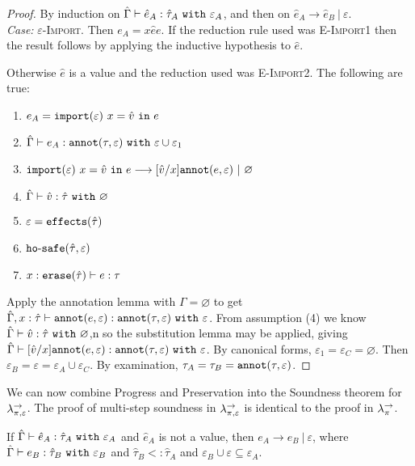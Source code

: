 \begin{proof} By induction on $\hat \Gamma \vdash \hat e_A: \hat \tau_A~\mathtt{with}~ \varepsilon_A$, and then on $\hat e_A \longrightarrow \hat e_B~|~\varepsilon$. \\

\textit{Case:} \textsc{$\varepsilon$-Import}. Then $e_A = {x}{\hat e}{e}$. If the reduction rule used was \textsc{E-Import1} then the result follows by applying the inductive hypothesis to $\hat e$.

Otherwise $\hat e$ is a value and the reduction used was \textsc{E-Import2}. The following are true:
\begin{enumerate}
	\setlength\itemsep{-0.7em}
	\item $e_A = \mathtt{import}(\varepsilon)~x = \hat v~\mathtt{in}~ e$
	\item $\hat \Gamma \vdash e_A: \mathtt{annot}(\tau, \varepsilon)~\mathtt{with}~ \varepsilon \cup \varepsilon_1$
	\item $\mathtt{import}(\varepsilon)~x = \hat v~\mathtt{in}~ e \longrightarrow [\hat v/x]\mathtt{annot}(e, \varepsilon)~|~\varnothing$
	\item $\hat \Gamma \vdash \hat v: \hat \tau~\mathtt{with}~ \varnothing$
	\item $\varepsilon = \mathtt{effects}(\hat \tau)$
	\item $\mathtt{ho \hbox{-} safe}(\hat \tau, \varepsilon)$
	\item $x: \mathtt{erase}(\hat \tau) \vdash e: \tau$
\end{enumerate}

\noindent
Apply the annotation lemma with $\Gamma = \varnothing$ to get $\hat \Gamma, x: \hat \tau \vdash \mathtt{annot}(e, \varepsilon): \mathtt{annot}(\tau, \varepsilon)~\mathtt{with}~ \varepsilon$. From assumption (4) we know $\hat \Gamma \vdash \hat v: \hat \tau~\mathtt{with}~ \varnothing$,n so the substitution lemma may be applied, giving $\hat \Gamma \vdash [\hat v/x]\mathtt{annot}(e, \varepsilon): \mathtt{annot}(\tau, \varepsilon)~\mathtt{with}~ \varepsilon$. By canonical forms, $\varepsilon_1 = \varepsilon_C = \varnothing$. Then $\varepsilon_B = \varepsilon = \varepsilon_A \cup \varepsilon_C$. By examination, $\tau_A = \tau_B = \mathtt{annot}(\tau, \varepsilon)$.
\end{proof}

We can now combine Progress and Preservation into the Soundness theorem for $\lambda^{\rightarrow}_{\pi, \varepsilon}$. The proof of multi-step soundness in $\lambda^{\rightarrow}_{\pi, \varepsilon}$ is identical to the proof in $\lambda^{\rightarrow}_{\pi}$.

\begin{theorem}[Soundness]
If $\hat \Gamma \vdash \hat e_A: \hat \tau_A~\mathtt{with}~ \varepsilon_A$ and $\hat e_A$ is not a value, then $e_A \longrightarrow e_B~|~\varepsilon$, where $\hat \Gamma \vdash e_B: \hat \tau_B~\mathtt{with}~ \varepsilon_B$ and $\hat \tau_B <: \hat \tau_A$ and $\varepsilon_B \cup \varepsilon \subseteq \varepsilon_A$.
\end{theorem}

